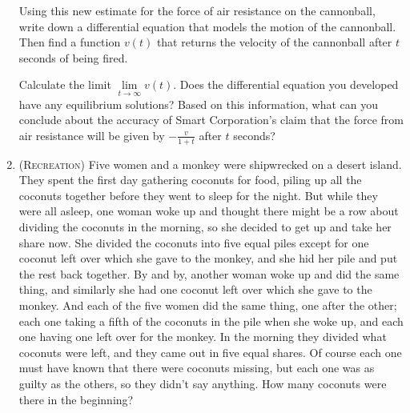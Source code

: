\begin{enumerate}[resume]
        Using this new estimate for the force of air resistance
        on the cannonball, write down a differential equation
        that models the motion of the cannonball. 
        Then find a function $v(t)$ that returns the velocity 
        of the cannonball after $t$ seconds of being fired.

        Calculate the limit $\lim\limits_{t \to \infty} v(t)$.
        Does the differential equation you developed 
        have any equilibrium solutions?
        Based on this information, what can you conclude
        about the accuracy of Smart Corporation's claim
        that the force from air resistance will be given by
        $-\frac{v}{1+t}$ after $t$ seconds?

    \item 
        (\textsc{Recreation})
        Five women and a monkey were shipwrecked on a desert island.
        They spent the first day gathering coconuts for food,
        piling up all the coconuts together 
        before they went to sleep for the night. 
        But while they were all asleep, one woman woke up and thought 
        there might be a row about dividing the coconuts in the morning, 
        so she decided to get up and take her share now. 
        She divided the coconuts into five equal piles except for
        one coconut left over which she gave to the monkey, 
        and she hid her pile and put the rest back together. 
        By and by, another woman woke up and did the same thing,
        and similarly she had one coconut left over 
        which she gave to the monkey. 
        And each of the five women did the same thing, one after the other; 
        each one taking a fifth of the coconuts in the pile when she woke up, 
        and each one having one left over for the monkey. 
        In the morning they divided what coconuts were left, 
        and they came out in five equal shares. 
        Of course each one must have known that there were coconuts missing,
        but each one was as guilty as the others, 
        so they didn't say anything. 
        How many coconuts were there in the beginning?

\end{enumerate}


